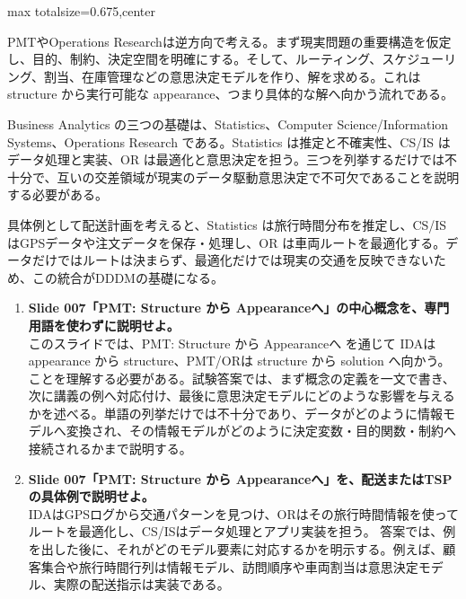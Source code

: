 \begin{adjustbox}{max totalsize={\textwidth}{0.675\textheight},center}
\begin{minipage}{\textwidth}
\begin{minipage}[t]{0.485\textwidth}
PMTやOperations Researchは逆方向で考える。まず現実問題の重要構造を仮定し、目的、制約、決定空間を明確にする。そして、ルーティング、スケジューリング、割当、在庫管理などの意思決定モデルを作り、解を求める。これは structure から実行可能な appearance、つまり具体的な解へ向かう流れである。\par
Business Analytics の三つの基礎は、Statistics、Computer Science/Information Systems、Operations Research である。Statistics は推定と不確実性、CS/IS はデータ処理と実装、OR は最適化と意思決定を担う。三つを列挙するだけでは不十分で、互いの交差領域が現実のデータ駆動意思決定で不可欠であることを説明する必要がある。\par
具体例として配送計画を考えると、Statistics は旅行時間分布を推定し、CS/IS はGPSデータや注文データを保存・処理し、OR は車両ルートを最適化する。データだけではルートは決まらず、最適化だけでは現実の交通を反映できないため、この統合がDDDMの基礎になる。\par
{}
\begin{enumerate}
\item \textbf{Slide 007「PMT: Structure から Appearanceへ」の中心概念を、専門用語を使わずに説明せよ。}\\このスライドでは、PMT: Structure から Appearanceへ を通じて IDAは appearance から structure、PMT/ORは structure から solution へ向かう。 ことを理解する必要がある。試験答案では、まず概念の定義を一文で書き、次に講義の例へ対応付け、最後に意思決定モデルにどのような影響を与えるかを述べる。単語の列挙だけでは不十分であり、データがどのように情報モデルへ変換され、その情報モデルがどのように決定変数・目的関数・制約へ接続されるかまで説明する。
\item \textbf{Slide 007「PMT: Structure から Appearanceへ」を、配送またはTSPの具体例で説明せよ。}\\IDAはGPSログから交通パターンを見つけ、ORはその旅行時間情報を使ってルートを最適化し、CS/ISはデータ処理とアプリ実装を担う。 答案では、例を出した後に、それがどのモデル要素に対応するかを明示する。例えば、顧客集合や旅行時間行列は情報モデル、訪問順序や車両割当は意思決定モデル、実際の配送指示は実装である。
\end{enumerate}
\end{minipage}
\end{minipage}
\end{adjustbox}

